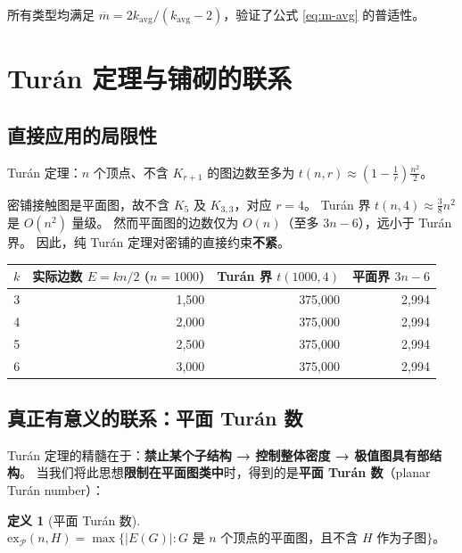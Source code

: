 \documentclass[12pt,a4paper]{article}
\theoremstyle{plain}
\theoremstyle{definition}
\newtheorem{definition}[theorem]{定义}
\theoremstyle{remark}
\begin{document}
所有类型均满足 $\overline{m} = 2k_{\text{avg}}/(k_{\text{avg}}-2)$，验证了公式 \eqref{eq:m-avg} 的普适性。

\section{Tur\'an 定理与铺砌的联系}

\subsection{直接应用的局限性}

Tur\'an 定理：$n$ 个顶点、不含 $K_{r+1}$ 的图边数至多为 $t(n,r) \approx \left(1 - \frac{1}{r}\right)\frac{n^2}{2}$。

密铺接触图是平面图，故不含 $K_5$ 及 $K_{3,3}$，对应 $r=4$。
Tur\'an 界 $t(n,4) \approx \frac{3}{8}n^2$ 是 $O(n^2)$ 量级。
然而平面图的边数仅为 $O(n)$（至多 $3n-6$），远小于 Tur\'an 界。
因此，纯 Tur\'an 定理对密铺的直接约束\textbf{不紧}。

\begin{center}
\begin{tabular}{c|r|r|r}
\toprule
$k$ & 实际边数 $E=kn/2$ ($n=1000$) & Tur\'an 界 $t(1000,4)$ & 平面界 $3n-6$ \\
\midrule
3 & 1,500 & 375,000 & 2,994 \\
4 & 2,000 & 375,000 & 2,994 \\
5 & 2,500 & 375,000 & 2,994 \\
6 & 3,000 & 375,000 & 2,994 \\
\bottomrule
\end{tabular}
\end{center}

\subsection{真正有意义的联系：平面 Tur\'an 数}

Tur\'an 定理的精髓在于：\textbf{禁止某个子结构 → 控制整体密度 → 极值图具有部结构}。
当我们将此思想\textbf{限制在平面图类中}时，得到的是\textbf{平面 Tur\'an 数}（planar Tur\'an number）：

\begin{definition}[平面 Tur\'an 数]
$\mathrm{ex}_{\mathcal{P}}(n, H) = \max\{|E(G)| : G \text{ 是 } n \text{ 个顶点的平面图，且不含 } H \text{ 作为子图}\}$。
\end{definition}
\end{document}

